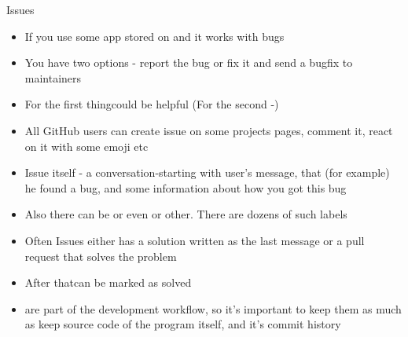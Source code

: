 \documentclass[usenames,dvipsnames,10pt,aspectratio=169]{beamer}
\begin{document}
\begin{frame}{Issues}
    \begin{itemize}
        \item If you use some app stored on  and it works with bugs
        \item You have two options - report the bug or fix it and send a bugfix to maintainers
        \item For the first thingcould be helpful (For the second -)
        \item All GitHub users can create issue on some projects pages, comment it, react on it with some emoji etc
        \item Issue itself - a conversation-starting with user's message, that (for example) he found a bug, and some information about how you got this bug
        \item Also there can be  or even  or other. There are dozens of such labels
        \item Often Issues either has a solution written as the last message or a pull request that solves the problem
        \item After thatcan be marked as solved
        \item {} are part of the development workflow, so it's important to keep them as much as keep source code of the program itself, and it's commit history
    \end{itemize}
\end{frame}

\end{document}
